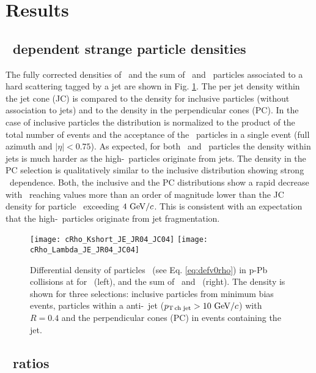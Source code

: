 \section{Results}
\label{sec:Results}

\subsection{\pt\ dependent strange particle densities}

The fully corrected densities of \ks\ and the sum of \lda\ and \alda\ particles associated to a hard scattering tagged by a jet are shown in Fig. \ref{fig:rhov0}. 
The per jet density within the jet cone (JC) is compared to the density for inclusive particles (without association to jets) and to the density in the perpendicular cones (PC).
In the case of inclusive particles the distribution is normalized to the product of the total number of events and the acceptance of the \vzero\ particles in a single event (full azimuth and $|\eta|<0.75$). 
As expected, for both \ks\ and \lda\ particles the density within jets is much harder as the high-\pt\ particles originate from jets. 
The density in the PC selection is qualitatively similar to the inclusive distribution showing strong \pt\ dependence. 
Both, the inclusive and the PC distributions show a rapid decrease with \pt\ reaching values more than an order of magnitude lower than the JC density for particle \pt\ exceeding $4~\mathrm{GeV}/c$.
This is consistent with an expectation that the high-\pt\ particles originate from jet fragmentation.

\begin{figure}[htbp]
	\centering
	\texttt{[image: cRho\_Kshort\_JE\_JR04\_JC04]}
	\texttt{[image: cRho\_Lambda\_JE\_JR04\_JC04]}
	\caption{Differential density of particles \drhodpt\ (see Eq. \ref{eq:defv0rho}) in p-Pb collisions at  for \ks\ (left), and the sum of \lda\ and \alda\ (right). The density is shown for three selections: inclusive particles from minimum bias events, particles within a anti-\kt\ jet ($p_\mathrm{T\,ch\;jet}>10~\mathrm{GeV}/c$) with $R=0.4$ and the perpendicular cones (PC) in events containing the jet.}
	\label{fig:rhov0}
\end{figure}

\subsection{\lda\ks\ ratios}

